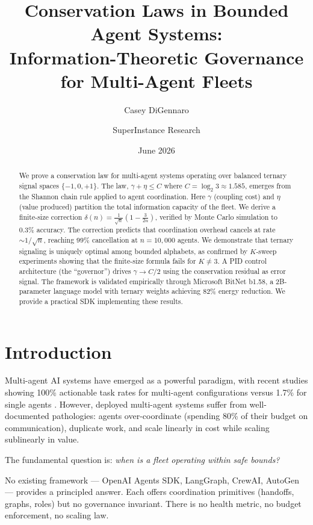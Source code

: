 \documentclass[11pt,a4paper]{article}
\title{Conservation Laws in Bounded Agent Systems: \\
Information-Theoretic Governance for Multi-Agent Fleets}
\author{Casey DiGennaro \and SuperInstance Research}
\date{June 2026}
\newcommand{\trit}{\{-1,0,+1\}}
\newcommand{\C}{C}
\newcommand{\gammaCoord}{\gamma}
\newcommand{\etaVal}{\eta}
\begin{document}
\maketitle

\begin{abstract}
We prove a conservation law for multi-agent systems operating over balanced ternary signal spaces $\trit$. The law, $\gammaCoord + \etaVal \leq \C$ where $\C = \log_2 3 \approx 1.585$, emerges from the Shannon chain rule applied to agent coordination. Here $\gammaCoord$ (coupling cost) and $\etaVal$ (value produced) partition the total information capacity of the fleet. We derive a finite-size correction $\delta(n) = \frac{1}{\sqrt{n}}\left(1 - \frac{3}{2n}\right)$, verified by Monte Carlo simulation to 0.3\% accuracy. The correction predicts that coordination overhead cancels at rate $\sim 1/\sqrt{n}$, reaching 99\% cancellation at $n = 10{,}000$ agents. We demonstrate that ternary signaling is uniquely optimal among bounded alphabets, as confirmed by $K$-sweep experiments showing that the finite-size formula fails for $K \neq 3$. A PID control architecture (the ``governor'') drives $\gammaCoord \to \C/2$ using the conservation residual as error signal. The framework is validated empirically through Microsoft BitNet b1.58, a 2B-parameter language model with ternary weights achieving 82\% energy reduction. We provide a practical SDK implementing these results.
\end{abstract}

\section{Introduction}

Multi-agent AI systems have emerged as a powerful paradigm, with recent studies showing 100\% actionable task rates for multi-agent configurations versus 1.7\% for single agents \cite{multiagent2025}. However, deployed multi-agent systems suffer from well-documented pathologies: agents over-coordinate (spending 80\% of their budget on communication), duplicate work, and scale linearly in cost while scaling sublinearly in value.

The fundamental question is: \emph{when is a fleet operating within safe bounds?}

No existing framework --- OpenAI Agents SDK, LangGraph, CrewAI, AutoGen --- provides a principled answer. Each offers coordination primitives (handoffs, graphs, roles) but no governance invariant. There is no health metric, no budget enforcement, no scaling law.
\end{document}

